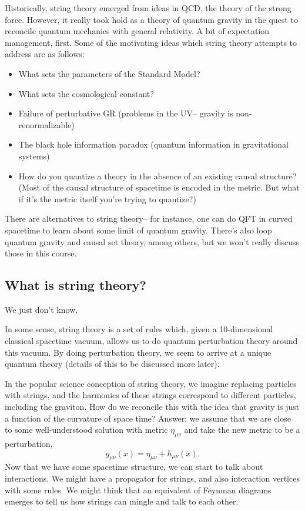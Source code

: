 Historically, string theory emerged from ideas in QCD, the theory of the strong force. However, it really took hold as a theory of quantum gravity in the quest to reconcile quantum mechanics with general relativity. A bit of expectation management, first. Some of the motivating ideas which string theory attempts to address are as follows:
\begin{itemize}
    \item What sets the parameters of the Standard Model?
    \item What sets the cosmological constant?
    \item Failure of perturbative GR (problems in the UV-- gravity is non-renormalizable)
    \item The black hole information paradox (quantum information in gravitational systems)
    \item How do you quantize a theory in the absence of an existing causal structure? (Most of the causal structure of spacetime is encoded in the metric. But what if it's the metric itself you're trying to quantize?)
\end{itemize}

There are alternatives to string theory-- for instance, one can do QFT in curved spacetime to learn about some limit of quantum gravity. There's also loop quantum gravity and causal set theory, among others, but we won't really discuss those in this course.

\subsection*{What is string theory?} We just don't know.

In some sense, string theory is a set of rules which, given a 10-dimensional classical spacetime vacuum, allows us to do quantum perturbation theory around this vacuum. By doing perturbation theory, we seem to arrive at a unique quantum theory (details of this to be discussed more later).

In the popular science conception of string theory, we imagine replacing particles with strings, and the harmonics of these strings correspond to different particles, including the graviton. How do we reconcile this with the idea that gravity is just a function of the curvature of space time? Answer: we assume that we are close to some well-understood solution with metric $\eta_{\mu\nu}$ and take the new metric to be a perturbation,
\begin{equation*}
    g_{\mu\nu}(x)=\eta_{\mu\nu}+h_{\mu\nu}(x).
\end{equation*}
Now that we have some spacetime structure, we can start to talk about interactions. We might have a propagator for strings, and also interaction vertices with some rules. We might think that an equivalent of Feynman diagrams emerges to tell us how strings can mingle and talk to each other.

